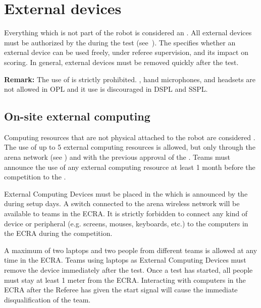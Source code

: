 %
%
\section{External devices}
\label{rule:robot_external_devices}
Everything which is not part of the robot is considered an .
All external devices must be authorized by the  during the  test (see~).
The  specifies whether an external device can be used freely, under referee supervision, and its impact on scoring.
In general, external devices must be removed quickly after the test.
	
\noindent \textbf{Remark:} The use of  is strictly prohibited. , hand microphones, and headsets are not allowed in OPL and it use is discouraged in DSPL and SSPL.

\subsection{On-site external computing}
Computing resources that are not physical attached to the robot are considered .
The use of up to 5 external computing resources is allowed, but only through the arena network (see ) and with the previous approval of the .
Teams must announce the use of any external computing resource at least 1 month before the competition to the .

External Computing Devices must be placed in the  which is announced by the  during setup days.
A switch connected to the arena wireless network will be available to teams in the ECRA.
It is strictly forbidden to connect any kind of device or peripheral (e.g. screens, mouses, keyboards, etc.) to the computers in the ECRA during the competition.

A maximum of two laptops and two people from different teams is allowed at any time in the ECRA.
Teams using laptops as External Computing Devices must remove the device immediately after the test.
Once a test has started, all people must stay at least 1 meter from the ECRA.
Interacting with computers in the ECRA after the Referee has given the start signal will cause the immediate disqualification of the team.

